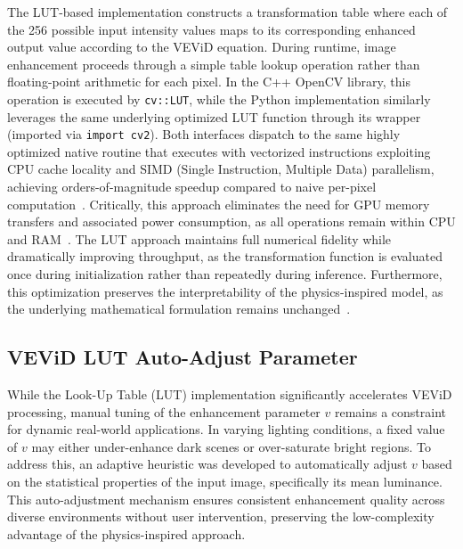 \documentclass[journal,transmag]{IEEEtran}
\begin{document}
The LUT-based implementation constructs a transformation table where each of the 256 possible input intensity values maps to its corresponding enhanced output value according to the VEViD equation. During runtime, image enhancement proceeds through a simple table lookup operation rather than floating-point arithmetic for each pixel. In the C++ OpenCV library, this operation is executed by \texttt{cv::LUT}, while the Python implementation similarly leverages the same underlying optimized LUT function through its wrapper (imported via \texttt{import cv2}). Both interfaces dispatch to the same highly optimized native routine that executes with vectorized instructions exploiting CPU cache locality and SIMD (Single Instruction, Multiple Data) parallelism, achieving orders-of-magnitude speedup compared to naive per-pixel computation~\cite{bradski2008opencv}. Critically, this approach eliminates the need for GPU memory transfers and associated power consumption, as all operations remain within CPU and RAM~\cite{arm2023mobile}. The LUT approach maintains full numerical fidelity while dramatically improving throughput, as the transformation function is evaluated once during initialization rather than repeatedly during inference. Furthermore, this optimization preserves the interpretability of the physics-inspired model, as the underlying mathematical formulation remains unchanged~\cite{zhou2023phycv}.

\subsection{VEViD LUT Auto-Adjust Parameter}
While the Look-Up Table (LUT) implementation significantly accelerates VEViD processing, manual tuning of the enhancement parameter $v$ remains a constraint for dynamic real-world applications. In varying lighting conditions, a fixed value of $v$ may either under-enhance dark scenes or over-saturate bright regions. To address this, an adaptive heuristic was developed to automatically adjust $v$ based on the statistical properties of the input image, specifically its mean luminance. This auto-adjustment mechanism ensures consistent enhancement quality across diverse environments without user intervention, preserving the low-complexity advantage of the physics-inspired approach.
\end{document}

